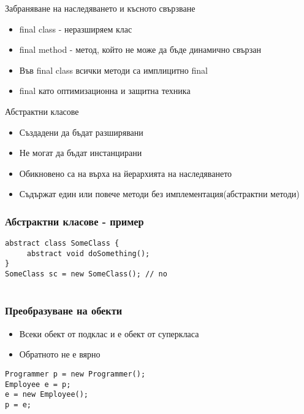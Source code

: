 \documentclass{beamer}
\begin{document}
\begin{frame}{Забраняване на наследяването и късното свързване}
  \transdissolve
  \begin{itemize}
  \item final class - неразширяем клас
  \item final method - метод, който не може да бъде динамично свързан
  \item Във final class всички методи са имплицитно final
  \item final като оптимизационна и защитна техника
  \end{itemize}
\end{frame}

\begin{frame}{Абстрактни класове}
  \transdissolve
  \begin{itemize}
  \item Създадени да бъдат разширявани
  \item Не могат да бъдат инстанцирани
  \item Обикновено са на върха на йерархията на наследяването
  \item Съдържат един или повече методи без имплементация(абстрактни методи)
  \end{itemize}
\end{frame}

\begin{frame}[fragile]
  \frametitle{Абстрактни класове - пример}
  \transdissolve
\begin{lstlisting}
abstract class SomeClass {
     abstract void doSomething();
}
SomeClass sc = new SomeClass(); // no
  
\end{lstlisting}
\end{frame}

\begin{frame}[fragile]
  \frametitle{Преобразуване на обекти}
  \transdissolve
  \begin{itemize}
  \item Всеки обект от подклас и е обект от суперкласа
  \item Обратното не е вярно
  \end{itemize}
\begin{lstlisting}
Programmer p = new Programmer();
Employee e = p;
e = new Employee();
p = e;
\end{lstlisting}

\end{frame}
\end{document}
